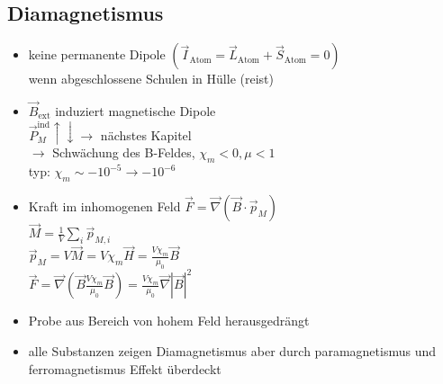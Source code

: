 \documentclass[titlepage,12pt,a4paper,ngerman]{report}
\newcommand{\tx}[1]{\textrm{#1}}
\begin{document}
\subsection{Diamagnetismus}
\begin{itemize}
	\item keine permanente Dipole $ (\vec{I}_{\tx{Atom}} = \vec{L}_{\tx{Atom}} + \vec{S}_{\tx{Atom}} = 0 )$\\
	wenn abgeschlossene Schulen in Hülle (reist)
	\item $ \vec{B}_{\tx{ext}} $ induziert magnetische Dipole\\
	$ \vec{P}^{\tx{ind}}_M \uparrow \downarrow \rightarrow $ nächstes Kapitel\\
	$ \rightarrow $ Schwächung des B-Feldes, $ \chi_m < 0, \mu < 1 $\\
	typ: $ \chi_m \sim - 10 ^{-5} \rightarrow -10^{-6} $
	\item Kraft im inhomogenen Feld $ \vec{F} = \vec{\nabla} (\vec{B} \cdot \vec{p}_M) $\\
	$ \vec{M} = \frac{1}{V} \sum_i \vec{p}_{M,i} $\\
	$ \vec{p}_M = V \vec{M} = V \chi_m \vec{H} = \frac{V \chi_m}{\mu_0} \vec{B}$\\
	$ \vec{F} = \vec{\nabla}(\vec{B} \frac{V \chi_m}{\mu_0} \vec{B}) = \frac{V \chi_m}{\mu_0} \vec{\nabla} |\vec{B}|^2$\\
	\item  Probe aus Bereich von hohem Feld herausgedrängt
	\item alle Substanzen zeigen Diamagnetismus aber durch paramagnetismus und  ferromagnetismus Effekt überdeckt
\end{itemize}
\end{document}
